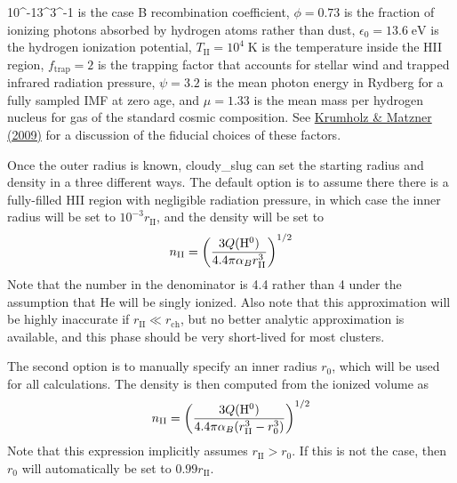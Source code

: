 \documentclass[letterpaper,10pt,english]{sphinxmanual}
\begin{document}
10^{-13}\;^3\;^{-1}\) is the case B recombination
coefficient, \(\phi = 0.73\) is the fraction of ionizing photons absorbed
by hydrogen atoms rather than dust, \(\epsilon_0 =
13.6\;\mathrm{eV}\) is the hydrogen ionization potential,
\(T_{\mathrm{II}} = 10^4\;\mathrm{K}\) is the temperature inside
the HII region, \(f_{\mathrm{trap}} = 2\) is the trapping factor
that accounts for stellar wind and trapped infrared radiation
pressure, \(\psi = 3.2\) is the mean photon energy in Rydberg for
a fully sampled IMF at zero age, and \(\mu = 1.33\) is the mean
mass per hydrogen nucleus for gas of the standard cosmic
composition. See \href{http://adsabs.harvard.edu/abs/2009ApJ...703.1352K}{Krumholz \& Matzner (2009)} for a discussion
of the fiducial choices of these factors.

Once the outer radius is known, cloudy\_slug can set the starting
radius and density in a three different ways. The default option is to
assume there there is a fully-filled HII region with negligible
radiation pressure, in which case the inner radius will be set to
\(10^{-3} r_{\mathrm{II}}\), and the density will be set to
\begin{gather}
\begin{split}n_{\mathrm{II}} = \left(\frac{3
Q(\mathrm{H}^0)}{4.4 \pi\alpha_B
r_{\mathrm{II}}^3}\right)^{1/2}\end{split}\notag
\end{gather}
Note that the number in the denominator is 4.4 rather than 4 under the
assumption that He will be singly ionized. Also note that this
approximation will be highly inaccurate if \(r_{\mathrm{II}} \ll
r_{\mathrm{ch}}\), but no better analytic approximation is available,
and this phase should be very short-lived for most clusters.

The second option is to manually specify an inner radius \(r_0\),
which will be used for all calculations. The density is then computed
from the ionized volume as
\begin{gather}
\begin{split}n_{\mathrm{II}} = \left(\frac{3
Q(\mathrm{H}^0)}{4.4 \pi\alpha_B
(r_{\mathrm{II}}^3 - r_0^3)}\right)^{1/2}\end{split}\notag
\end{gather}
Note that this expression implicitly assumes \(r_{\mathrm{II}} >
r_0\). If this is not the case, then \(r_0\) will automatically be
set to \(0.99 r_{\mathrm{II}}\).
\end{document}
